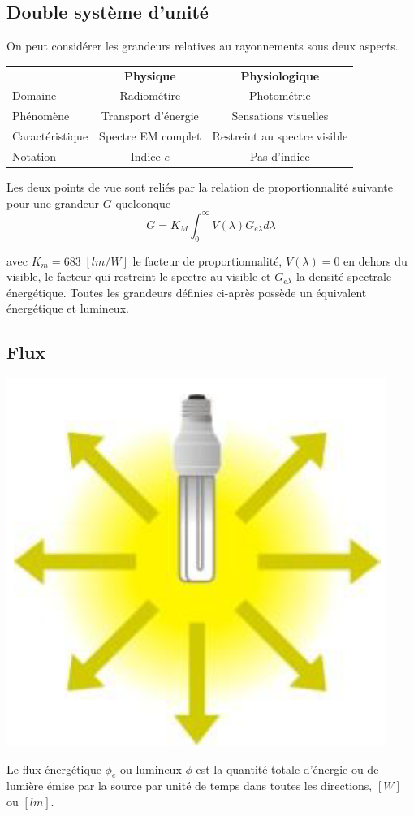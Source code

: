 \documentclass[11pt]{report}
\begin{document}
\subsection{Double système d'unité}
On peut considérer les grandeurs relatives au rayonnements sous deux aspects.

\begin{center}
\begin{tabular}{l|cc}
 &  \textbf{Physique} & \textbf{Physiologique}\\ 
 Domaine & Radiométire & Photométrie\\
Phénomène & Transport d'énergie & Sensations visuelles\\
Caractéristique & Spectre EM complet & Restreint au spectre visible\\
Notation & Indice $e$ & Pas d'indice\\
\end{tabular}
\end{center}

Les deux points de vue sont reliés par la relation de proportionnalité suivante pour une grandeur $G$ quelconque
$$G = K_M \int_0^{\infty} V(\lambda) G_{e\lambda} d\lambda$$

avec $K_m = 683 \; [lm/W]$ le facteur de proportionnalité, $V(\lambda)=0$ en dehors du visible, le facteur qui restreint le spectre au visible et $G_{e\lambda}$ la densité spectrale énergétique. Toutes les grandeurs définies ci-après possède un équivalent énergétique et lumineux.

\subsection{Flux}
\begin{minipage}{0.2\linewidth}
\centering
\includegraphics[scale=0.2]{flux}
\end{minipage}
\begin{minipage}{0.75\linewidth}
Le flux énergétique $\phi_e$ ou lumineux $\phi$ est la quantité totale d'énergie ou de lumière émise par la source par unité de temps dans toutes les directions, $[W]$ ou $[lm]$.
\end{minipage}
\end{document}
